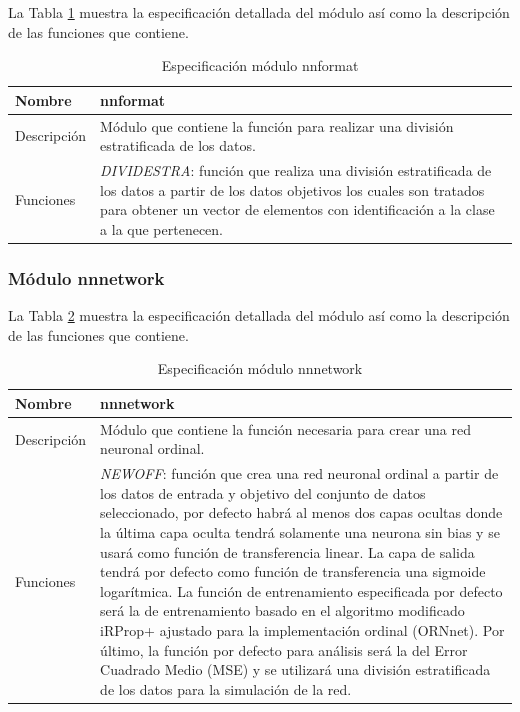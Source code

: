 			La Tabla \ref{modulo_nnformat} muestra la especificación detallada del módulo así como la descripción de las funciones que contiene.
			
			\begin{table}[!h]
				\centering
				\begin{tabular}{l|p{.5\linewidth}}
					\hline Nombre & nnformat \\ 
					\hline Descripción & Módulo que contiene la función para realizar una división estratificada de los datos. \\ 
					\hline Funciones & \textit{DIVIDESTRA}: función que realiza una división estratificada de los datos a partir de los datos objetivos los cuales son tratados para obtener un vector de elementos con identificación a la clase a la que pertenecen. \\ 
					\hline 
				\end{tabular}
				\caption{Especificación módulo nnformat}
				\label{modulo_nnformat}
			\end{table}
			
			\subsubsection{Módulo nnnetwork}
		
			La Tabla \ref{modulo_nnnetwork} muestra la especificación detallada del módulo así como la descripción de las funciones que contiene.
			
			\begin{table}[!h]
				\centering
				\begin{tabular}{l|p{.5\linewidth}}
					\hline Nombre & nnnetwork \\ 
					\hline Descripción & Módulo que contiene la función necesaria para crear una red neuronal ordinal. \\ 
					\hline Funciones & \textit{NEWOFF}: función que crea una red neuronal ordinal a partir de los datos de entrada y objetivo del conjunto de datos seleccionado, por defecto habrá al menos dos capas ocultas donde la última capa oculta tendrá solamente una neurona sin bias y se usará como función de transferencia linear. La capa de salida tendrá por defecto como función de transferencia una sigmoide logarítmica. La función de entrenamiento especificada por defecto será la de entrenamiento basado en el algoritmo modificado iRProp+ ajustado para la implementación ordinal (ORNnet). Por último, la función por defecto para análisis será la del Error Cuadrado Medio (MSE) y se utilizará una división estratificada de los datos para la simulación de la red. \\ 
					\hline 
				\end{tabular}
				\caption{Especificación módulo nnnetwork}
				\label{modulo_nnnetwork}
			\end{table}
			
